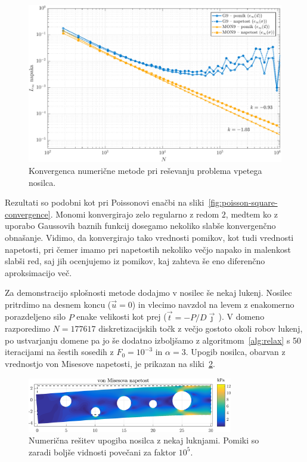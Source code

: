 \documentclass[12pt,a4paper,twoside]{article}
\theoremstyle{definition} %
\theoremstyle{plain} %
\numberwithin{equation}{section}
\newcommand{\vt}{\vec{t}}
\newcommand{\vu}{\vec{u}}
\newcommand{\vj}{\vec{\jmath}}
\newlength{\iw}
\begin{document}
\begin{figure}[h]
  \centering
  \includegraphics[width=\iw]{images/cantilever_beam_convergence.pdf}
  \caption[Konvergenca metode pri reševanju problema vpetega nosilca.]{Konvergenca numerične metode
  pri reševanju problema vpetega nosilca.}
  \label{fig:cantilever-beam-convergence}
\end{figure}
Rezultati so podobni kot pri Poissonovi enačbi na sliki~\ref{fig:poisson-square-convergence}.
Monomi konvergirajo zelo regularno z redom $2$, medtem ko z uporabo Gaussovih baznih funkcij
dosegamo nekoliko slabše konvergenčno obnašanje. Vidimo, da konvergirajo tako vrednosti pomikov, kot
tudi vrednosti napetosti, pri čemer imamo pri napetostih nekoliko večjo napako in malenkost slabši red,
saj jih ocenjujemo iz pomikov, kaj zahteva še eno diferenčno aproksimacijo več.

Za demonstracijo splošnosti metode dodajmo v nosilec še nekaj lukenj. Nosilec pritrdimo na desnem
koncu ($\vu = 0$) in vlecimo navzdol na levem z enakomerno porazdeljeno silo $P$ enake velikosti kot
prej ($\vt = -P/D\vj$\,). V domeno razporedimo $N = 177617$ diskretizacijskih točk z večjo
gostoto okoli robov lukenj, po ustvarjanju domene pa jo še dodatno izboljšamo z
algoritmom~\ref{alg:relax} s 50 iteracijami na šestih sosedih z $F_0 = 10^{-3}$ in $\alpha = 3$.
Upogib nosilca, obarvan z vrednostjo von Misesove napetosti, je prikazan na
sliki~\ref{fig:cantilever-beam-with-holes}.

\begin{figure}[h]
  \centering
  \includegraphics[width=0.8\textwidth]{images/cantilever_beam_with_holes.png}
  \caption[Numerična rešitev upogiba nosilca z nekaj luknjami.]{Numerična
  rešitev upogiba nosilca z nekaj luknjami. Pomiki so zaradi boljše vidnosti
  povečani za faktor $10^5$.}
  \label{fig:cantilever-beam-with-holes}
\end{figure}
\end{document}
